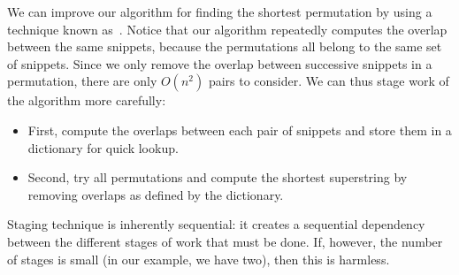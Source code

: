\begin{cluster}
\label{grp:alg:genome::finding-the-shortest-permutation-improved}

\begin{algorithm}
\label{alg:genome::finding-the-shortest-permutation-improved}
We can improve our algorithm for finding the shortest permutation by
using a technique known as~.
Notice that our algorithm repeatedly computes the overlap between the
same snippets, because the permutations all belong to the same set of
snippets.
Since we only remove the overlap between successive snippets in a
permutation, there are only $O(n^2)$ pairs to consider.
We can thus stage work of the algorithm more carefully:

\begin{itemize}
\item First,  compute the overlaps between each pair of snippets and
  store them in a dictionary for quick lookup.
\item Second, try all permutations and compute the shortest
  superstring by removing overlaps as defined by the dictionary.
\end{itemize}

\end{algorithm}
\end{cluster}

\begin{cluster}
\label{grp:nt:genome::staging}

\begin{note}
\label{nt:genome::staging}
Staging technique is inherently sequential: it creates a sequential
dependency between the different stages of work that must be done.  
If, however, the number of stages is small (in our example, we have
two), then this is harmless. 

\end{note}
\end{cluster}

